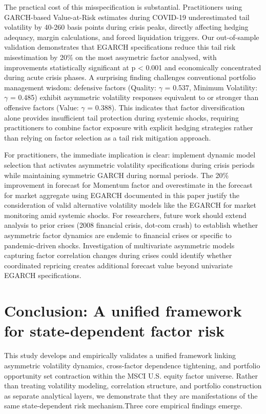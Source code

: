\documentclass{article}
\begin{document}
The practical cost of this misspecification is substantial. Practitioners using GARCH-based Value-at-Risk estimates during COVID-19 underestimated tail volatility by 40-260 basis points during crisis peaks, directly affecting hedging adequacy, margin calculations, and forced liquidation triggers. Our out-of-sample validation demonstrates that EGARCH specifications reduce this tail risk misestimation by 20\% on the most assymetric factor analysed, with improvements statistically significant at p < 0.001 and economically concentrated during acute crisis phases. A surprising finding challenges conventional portfolio management wisdom: defensive factors (Quality: $\gamma$ = 0.537, Minimum Volatility: $\gamma$ = 0.485) exhibit asymmetric volatility responses equivalent to or stronger than offensive factors (Value: $\gamma$ = 0.388). This indicates that factor diversification alone provides insufficient tail protection during systemic shocks, requiring practitioners to combine factor exposure with explicit hedging strategies rather than relying on factor selection as a tail risk mitigation approach.\newline

For practitioners, the immediate implication is clear: implement dynamic model selection that activates asymmetric volatility specifications during crisis periods while maintaining symmetric GARCH during normal periods. The 20\% improvement in forecast for Momentum factor and overestimate in the forecast for market aggregate using EGARCH documented in this paper justify the consideration of valid alternative volatility models like the EGARCH for market monitoring amid systemic shocks. For researchers, future work should extend analysis to prior crises (2008 financial crisis, dot-com crash) to establish whether asymmetric factor dynamics are endemic to financial crises or specific to pandemic-driven shocks. Investigation of multivariate asymmetric models capturing factor correlation changes during crises could identify whether coordinated repricing creates additional forecast value beyond univariate EGARCH specifications.\newline

\section{Conclusion: A unified framework for state-dependent factor risk}

This study develops and empirically validates a unified framework linking asymmetric volatility dynamics, cross-factor dependence tightening, and portfolio opportunity set contraction within the MSCI U.S. equity factor universe. Rather than treating volatility modeling, correlation structure, and portfolio construction as separate analytical layers, we demonstrate that they are manifestations of the same state-dependent risk mechanism.Three core empirical findings emerge.
\end{document}
